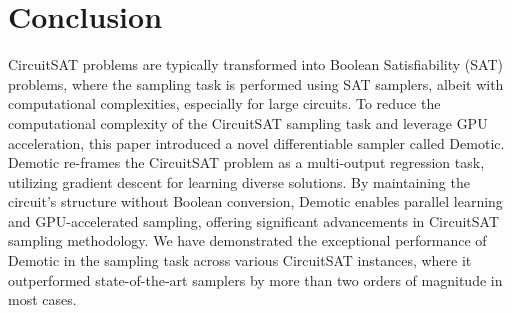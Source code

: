 \vspace{-0.25cm}
\section{Conclusion}
CircuitSAT problems are typically transformed into Boolean Satisfiability (SAT) problems, where the sampling task is performed using SAT samplers, albeit with computational complexities, especially for large circuits. To reduce the computational complexity of the CircuitSAT sampling task and leverage GPU acceleration, this paper introduced a novel differentiable sampler called {\sc Demotic}. {\sc Demotic} re-frames the CircuitSAT problem as a multi-output regression task, utilizing gradient descent for learning diverse solutions. By maintaining the circuit's structure without Boolean conversion, {\sc Demotic} enables parallel learning and GPU-accelerated sampling, offering significant advancements in CircuitSAT sampling methodology. We have demonstrated the exceptional performance of {\sc Demotic} in the sampling task across various CircuitSAT instances, where it outperformed state-of-the-art samplers by more than two orders of magnitude in most cases.